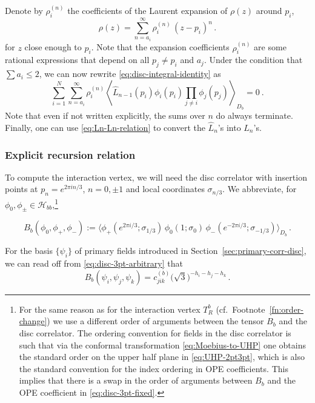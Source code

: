 \documentclass[11pt,a4paper]{article}
\numberwithin{equation}{section}
\begin{document}
Denote by $\rho_i^{(n)}$ the coefficients of the Laurent expansion of $\rho(z)$ around $p_i$,
%
\begin{equation}\label{eq:rhoi}
    \rho(z) = \sum_{n=a_i}^\infty \rho_i^{(n)} \, (z-p_i)^n\,.
\end{equation}
for $z$ close enough to $p_i$.
Note that the expansion coefficients $\rho_i^{(n)}$ are some rational expressions that depend on all $p_j\neq p_i$ and $a_j$. 
Under the condition that $\sum a_i\leq 2$, we can now rewrite \eqref{eq:disc-integral-identity} as
%
\begin{equation}
    \sum_{i=1}^N \sum_{n=a_i}^\infty \rho_i^{(n)} 
    \left\langle \widehat{L}_{n-1}(p_i) \phi_i(p_i)
    \prod_{j\neq i} \phi_j(p_j)
    \right\rangle_{\!\!D_b} = 0~.
    \label{eq:WardIdNpt}
\end{equation}
%
Note that even if not written explicitly, the sums over $n$ do always terminate. 
Finally, one can use \eqref{eq:Ln-Ln-relation} to convert the $\widehat{L}_n$'s into $L_n$'s.

\subsubsection{Explicit recursion relation}\label{sec:disc-explicit-rec}

To compute the interaction vertex, we will need the disc correlator with insertion points at $p_n = e^{2 \pi i n/3}$, $n = 0,\pm 1$ and local coordinates $\sigma_{n/3}$. We abbreviate, for $\phi_0,\phi_\pm \in \mathcal{H}_{bb}$,\footnote{
    For the same reason as for the interaction vertex $T^b_R$ (cf.\ Footnote~\ref{fn:order-change}) we use a different order of arguments between the tensor $B_b$ and the disc correlator. The ordering convention for fields in the disc correlator is such that via the conformal transformation \eqref{eq:Moebius-to-UHP}
one obtains the standard order on the upper half plane in \eqref{eq:UHP-2pt3pt}, which is also the standard convention for the index ordering in OPE coefficients. This implies that there is a swap in the order of arguments between $B_b$ and the OPE coefficient in \eqref{eq:disc-3pt-fixed}.
}

%
\begin{equation}\label{eq:B_b-def}
B_b(\phi_0,\phi_+,\phi_-) := \big\langle 
    \phi_+(e^{2\pi i/3};\sigma_{1/3}) \, 
    \phi_0(1;\sigma_{0}) \, 
    \phi_-(e^{-2\pi i/3};\sigma_{-1/3}) 
	\big\rangle_{D_b}\,.
\end{equation}

\noindent
For the basis $\{\psi_i\}$ of primary fields introduced in Section~\ref{sec:primary-corr-disc},  we can read off from \eqref{eq:disc-3pt-arbitrary} that
\begin{equation} 
B_b(\psi_i,\psi_j,\psi_k) = c^{(b)}_{jik}  
    \big(\sqrt3\big)^{-h_i-h_j-h_k} \,.
	\label{eq:disc-3pt-fixed}
\end{equation}
\end{document}
